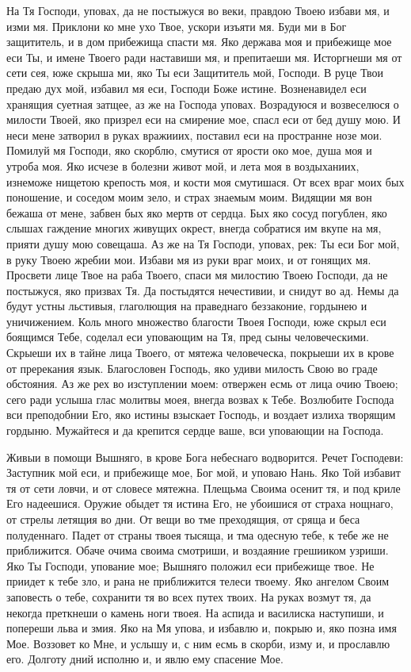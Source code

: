 \begin{mymulticols}


На Тя Господи, уповах, да не постыжуся во веки, правдою Твоею избави мя, и изми мя. Приклони ко мне ухо Твое, ускори изъяти мя. Буди ми в Бог защититель, и в дом прибежища спасти мя. Яко держава моя и прибежище мое еси Ты, и имене Твоего ради наставиши мя, и препитаеши мя. Исторгнеши мя от сети сея, юже скрыша ми, яко Ты еси Защититель мой, Господи. В руце Твои предаю дух мой, избавил мя еси, Господи Боже истине. Возненавидел еси хранящия суетная затщее, аз же на Господа уповах. Возрадуюся и возвеселюся о милости Твоей, яко призрел еси на смирение мое, спасл еси от бед душу мою. И неси мене затворил в руках вражииих, поставил еси на пространне нозе мои. Помилуй мя Господи, яко скорблю, смутися от ярости око мое, душа моя и утроба моя. Яко исчезе в болезни живот мой, и лета моя в воздыханиих, изнеможе нищетою крепость моя, и кости моя смутишася. От всех враг моих бых поношение, и соседом моим зело, и страх знаемым моим. Видящии мя вон бежаша от мене, забвен бых яко мертв от сердца. Бых яко сосуд погублен, яко слышах гаждение многих живущих окрест, внегда собратися им вкупе на мя, прияти душу мою совещаша. Аз же на Тя Господи, уповах, рек: Ты еси Бог мой, в руку Твоею жребии мои. Избави мя из руки враг моих, и от гонящих мя. Просвети лице Твое на раба Твоего, спаси мя милостию Твоею Господи, да не постыжуся, яко призвах Тя. Да постыдятся нечестивии, и снидут во ад. Немы да будут устны льстивыя, глаголющия на праведнаго беззаконие, гордынею и уничижением. Коль много множество благости Твоея Господи, юже скрыл еси боящимся Тебе, соделал еси уповающим на Тя, пред сыны человеческими. Скрыеши их в тайне лица Твоего, от мятежа человеческа, покрыеши их в крове от пререкания язык. Благословен Господь, яко удиви милость Свою во граде обстояния. Аз же рех во изступлении моем: отвержен есмь от лица очию Твоею; сего ради услыша глас молитвы моея, внегда возвах к Тебе. Возлюбите Господа вси преподобнии Его, яко истины взыскает Господь, и воздает излиха творящим гордыню. Мужайтеся и да крепится сердце ваше, вси уповающии на Господа.




Живыи в помощи Вышняго, в крове Бога небеснаго водворится. Речет Господеви: Заступник мой еси, и прибежище мое, Бог мой, и уповаю Нань. Яко Той избавит тя от сети ловчи, и от словесе мятежна. Плещьма Своима осенит тя, и под криле Его надеешися. Оружие обыдет тя истина Его, не убоишися от страха нощнаго, от стрелы летящия во дни. От вещи во тме преходящия, от сряща и беса полуденнаго. Падет от страны твоея тысяща, и тма одесную тебе, к тебе же не приближится. Обаче очима своима смотриши, и воздаяние грешииком узриши. Яко Ты Господи, упование мое; Вышняго положил еси прибежище твое. Не приидет к тебе зло, и рана не приближится телеси твоему. Яко ангелом Своим заповесть о тебе, сохранити тя во всех путех твоих. На руках возмут тя, да некогда преткнеши о камень ноги твоея. На аспида и василиска наступиши, и попереши льва и змия. Яко на Мя упова, и избавлю и, покрыю и, яко позна имя Мое. Воззовет ко Мне, и услышу и, с ним есмь в скорби, изму и, и прославлю его. Долготу дний исполню и, и явлю ему спасение Мое.



\end{mymulticols}
